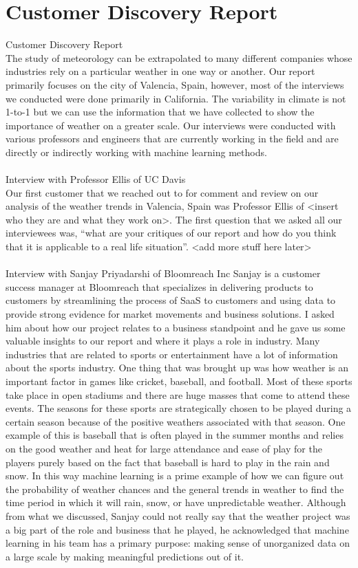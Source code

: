 \documentclass[10pt]{article}
\begin{document}
\section{Customer Discovery Report}\label{sec:7}
Customer Discovery Report\\
The study of meteorology can be extrapolated to many different companies whose industries rely on a particular weather in one way or another. Our report primarily focuses on the city of Valencia, Spain, however, most of the interviews we conducted were done primarily in California. The variability in climate is not 1-to-1 but we can use the information that we have collected to show the importance of weather on a greater scale. Our interviews were conducted with various professors and engineers that are currently working in the field and are directly or indirectly working with machine learning methods. 
\\
\\
Interview with Professor Ellis of UC Davis\\
Our first customer that we reached out to for comment and review on our analysis of the weather trends in Valencia, Spain was Professor Ellis of <insert who they are and what they work on>. The first question that we asked all our interviewees was, “what are your critiques of our report and how do you think that it is applicable to a real life situation”. <add more stuff here later> 
\\
\\
Interview with Sanjay Priyadarshi of Bloomreach Inc
Sanjay is a customer success manager at Bloomreach that specializes in delivering products to customers by streamlining the process of SaaS to customers and using data to provide strong evidence for market movements and business solutions. I asked him about how our project relates to a business standpoint and he gave us some valuable insights to our report and where it plays a role in industry. Many industries that are related to sports or entertainment have a lot of information about the sports industry. One thing that was brought up was how weather is an important factor in games like cricket, baseball, and football. Most of these sports take place in open stadiums and there are huge masses that come to attend these events. The seasons for these sports are strategically chosen to be played during a certain season because of the positive weathers associated with that season. One example of this is baseball that is often played in the summer months and relies on the good weather and heat for large attendance and ease of play for the players purely based on the fact that baseball is hard to play in the rain and snow. In this way machine learning is a prime example of how we can figure out the probability of weather chances and the general trends in weather to find the time period in which it will rain, snow, or have unpredictable weather. Although from what we discussed, Sanjay could not really say that the weather project was a big part of the role and business that he played, he acknowledged that machine learning in his team has a primary purpose: making sense of unorganized data on a large scale by making meaningful predictions out of it.
\end{document}
